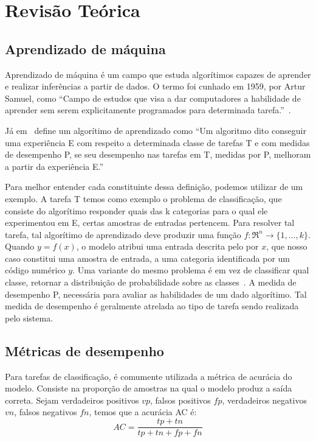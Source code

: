 \section{Revisão Teórica}\label{sec:Cap2_revisao_teorica}

\subsection{Aprendizado de máquina}\label{sec:aprendizado_maquina}

Aprendizado de máquina é um campo que estuda algorítimos capazes de aprender e realizar inferências a partir de dados. O termo foi cunhado em 1959, por Artur Samuel, como “Campo de estudos que visa a dar computadores a habilidade de aprender sem serem explicitamente programados para determinada tarefa.”~\cite{Samuel1959SomeSI}.

Já em~\cite{Mitchell97} define um algorítimo de aprendizado como “Um algoritmo dito conseguir uma experiência E com respeito a determinada classe de tarefas T e com medidas de desempenho P, se seu desempenho nas tarefas em T, medidas por P, melhoram a partir da experiência E.”

Para melhor entender cada constituinte dessa definição, podemos utilizar de um exemplo. A tarefa T temos como exemplo o problema de classificação, que consiste do algorítimo responder quais das k categorias para o qual ele experimentou em E, certas amostras de entradas pertencem. Para resolver tal tarefa, tal algorítimo de aprendizado deve produzir uma função \(f:\Re^n\rightarrow \{1,\ldots,k\}\). Quando \( y=f(x) \), o modelo atribui uma entrada descrita pelo por \(x\), que nosso caso constitui uma amostra de entrada, a uma categoria identificada por um código numérico \(y\). Uma variante do mesmo problema é em vez de classificar qual classe, retornar a distribuição de probabilidade sobre as classes~\cite{GoodBengCour16}. A medida de desempenho P, necessária para avaliar as habilidades de um dado algorítimo. Tal medida de desempenho é geralmente atrelada ao tipo de tarefa sendo realizada pelo sistema. 

\subsection{Métricas de desempenho}\label{sec:cap2_metricas_desempenho}


Para tarefas de classificação, é comumente utilizada a métrica de acurácia do modelo. Consiste na proporção de amostras na qual o modelo produz a saída correta. Sejam verdadeiros positivos $vp$, falsos positivos $fp$, verdadeiros negativos $vn$, falsos negativos $fn$, temos que a acurácia AC é:
\begin{equation}AC = \frac{tp + tn}{tp + tn + fp + fn} \end{equation}

